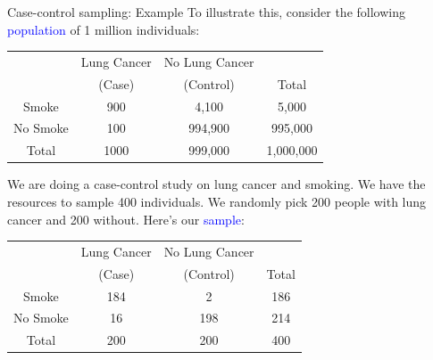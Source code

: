 \documentclass[10pt,t]{beamer}
\begin{document}
\begin{frame}{Case-control sampling: Example}
	\vspace{-0.5cm}
	To illustrate this, consider the following \textcolor{blue}{population} of 1 million individuals:
	\begin{center}
		\begin{table}
			\begin{tabular}{|c|cc|c|}
				\hline 
				& Lung Cancer & No Lung Cancer &  \\ 
				& (Case) & (Control) & Total  \\
				\hline 
				Smoke & 900 & 4,100  & 5,000 \\ 
				No Smoke & 100 & 994,900 & 995,000  \\ 
				\hline 
				Total & 1000 & 999,000 & 1,000,000 \\ 
				\hline 
			\end{tabular}
		\end{table}
	\end{center} 
\medskip

	We are doing a case-control study on lung cancer and smoking. We have the resources to sample 400 individuals. We randomly pick 200 people with lung cancer and 200 without. Here's our \textcolor{blue}{sample}:
		\begin{center}
		\begin{table}
			\begin{tabular}{|c|cc|c|}
				\hline 
				& Lung Cancer & No Lung Cancer &  \\ 
				& (Case) & (Control) & Total  \\
				\hline 
				Smoke & 184 & 2  & 186 \\ 
				No Smoke & 16 & 198 & 214  \\ 
				\hline 
				Total & 200 & 200 & 400 \\ 
				\hline 
			\end{tabular}
		\end{table}
	\end{center}
\end{frame}
\end{document}
